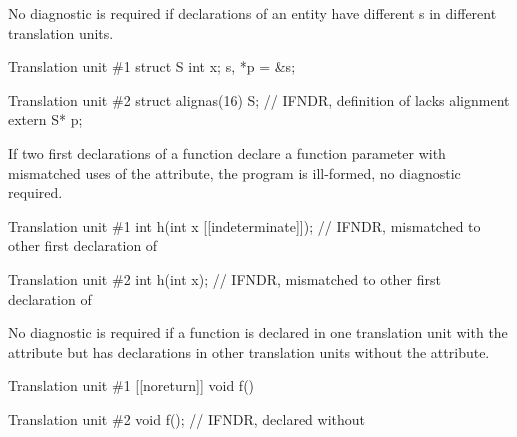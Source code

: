 
\pnum
No diagnostic is required if declarations of an entity have different s in different
translation units.

\pnum
\begin{example}
\begin{codeblocktu}{Translation unit \#1}
struct S { int x; } s, *p = &s;
\end{codeblocktu}
\begin{codeblocktu}{Translation unit \#2}
struct alignas(16) S;   // IFNDR, definition of  lacks alignment
extern S* p;
\end{codeblocktu}
\end{example}


\pnum
If two first declarations of a function
declare a function parameter with
mismatched uses of the  attribute,
the program is ill-formed, no diagnostic required.

\pnum
\begin{example}
\begin{codeblocktu}{Translation unit \#1}
int h(int x [[indeterminate]]); // IFNDR, mismatched \tcode{[[indeterminate]]} to other first declaration of 
\end{codeblocktu}
\begin{codeblocktu}{Translation unit \#2}
int h(int x);                   // IFNDR, mismatched \tcode{[[indeterminate]]} to other first declaration of 
\end{codeblocktu}
\end{example}


\pnum
No diagnostic is required if a function is declared
in one translation unit with the  attribute
but has declarations in other translation units
without the attribute.

\pnum
\begin{example}
\begin{codeblocktu}{Translation unit \#1}
[[noreturn]] void f() {}
\end{codeblocktu}
\begin{codeblocktu}{Translation unit \#2}
void f();           // IFNDR, declared without 
\end{codeblocktu}
\end{example}

